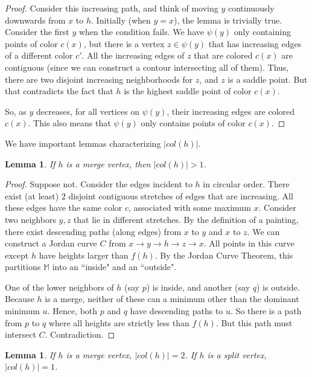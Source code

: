 \documentclass[11pt]{article}
\newtheorem{lemma}[theorem]{Lemma}
\theoremstyle{definition}
\newcommand{\MM}{\mathbb{M}}
\newcommand{\col}{col}
\newcommand{\cont}{\psi}
\begin{document}
{\begin{proof} Consider this increasing path, and think of moving $y$ continuously downwards from $x$
to $h$. Initially (when $y = x$), the lemma is trivially true. Consider the first $y$
when the condition fails. We have $\cont(y)$ only containing points of color $c(x)$,
but there is a vertex $z \in \cont(y)$ that has increasing edges of a different color $c'$.
All the increasing edges of $z$ that are colored $c(x)$ are contiguous (since we can construct
a contour intersecting all of them). Thus, there are two disjoint increasing neighborhoods for $z$,
and $z$ is a saddle point. But that contradicts the fact that $h$ is the highest saddle point
of color $c(x)$.

So, as $y$ decreases, for all vertices on $\cont(y)$, their increasing edges are colored $c(x)$.
This also means that $\cont(y)$ only contains points of color $c(x)$.
\end{proof}

We have important lemmas characterizing $|\col(h)|$.

\begin{lemma} \label{lem:mono} If $h$ is a merge vertex, then $|\col(h)| > 1$.
\end{lemma}

\begin{proof} Suppose not. Consider the edges incident to $h$ in circular order. There exist (at least) $2$
disjoint contiguous stretches of edges that are increasing. 
All these edges have the same color $c$, associated with some maximum $x$. Consider two neighbors $y,z$
that lie in different stretches. By the definition of a painting, there exist descending paths (along
edges) from $x$ to $y$ and $x$ to $z$. We can construct a Jordan curve $C$ from $x \rightarrow y
\rightarrow h \rightarrow z \rightarrow x$. All points in this curve except $h$ have 
heights larger than $f(h)$. By the Jordan Curve Theorem, this partitions $\MM$ into
an ``inside" and an ``outside". 

One of the lower neighbors of $h$ (say $p$) is inside, and another (say $q$) is outside.
Because $h$ is a merge, neither of these can a minimum other than the dominant minimum $u$.
Hence, both $p$ and $q$ have descending paths to $u$. So there is a path from $p$
to $q$ where all heights are strictly less than $f(h)$. But this path must intersect $C$.
Contradiction.
\end{proof}

\begin{lemma} \label{lem:col} If $h$ is a merge vertex, $|\col(h)| = 2$.
If $h$ is a split vertex, $|\col(h)| = 1$.
\end{lemma}

}
\end{document}
